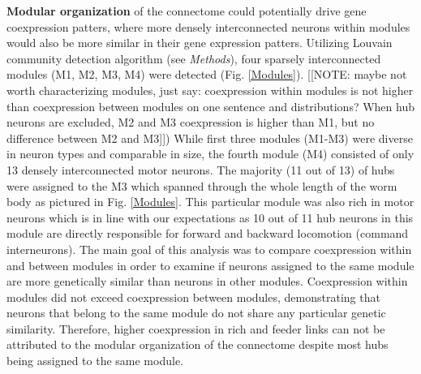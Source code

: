 \documentclass[10pt,letterpaper]{article}
\begin{document}
\textbf{Modular organization} of the connectome could potentially drive gene coexpression patters, where more densely interconnected neurons within modules would also be more similar in their gene expression patters.
Utilizing Louvain community detection algorithm (see \textit{Methods}), four sparsely interconnected modules (M1, M2, M3, M4) were detected (Fig. \ref{Modules}).
[[NOTE: maybe not worth characterizing modules, just say: coexpression within modules is not higher than coexpression between modules on one sentence and distributions? When hub neurons are excluded, M2 and M3 coexpression is higher than M1, but no difference between M2 and M3]])
While first three modules (M1-M3) were diverse in neuron types and comparable in size, the fourth module (M4) consisted of only 13 densely interconnected motor neurons.
The majority (11 out of 13) of hubs were assigned to the M3 which spanned through the whole length of the worm body as pictured in Fig. \ref{Modules}.
This particular module was also rich in motor neurons which is in line with our expectations as 10 out of 11 hub neurons in this module are directly responsible for forward and backward locomotion (command interneurons).
The main goal of this analysis was to compare coexpression within and between modules in order to examine if neurons assigned to the same module are more genetically similar than neurons in other modules.
Coexpression within modules did not exceed coexpression between modules, demonstrating that neurons that belong to the same module do not share any particular genetic similarity.
Therefore, higher coexpression in rich and feeder links can not be attributed to the modular organization of the connectome despite most hubs being assigned to the same module.
\end{document}
